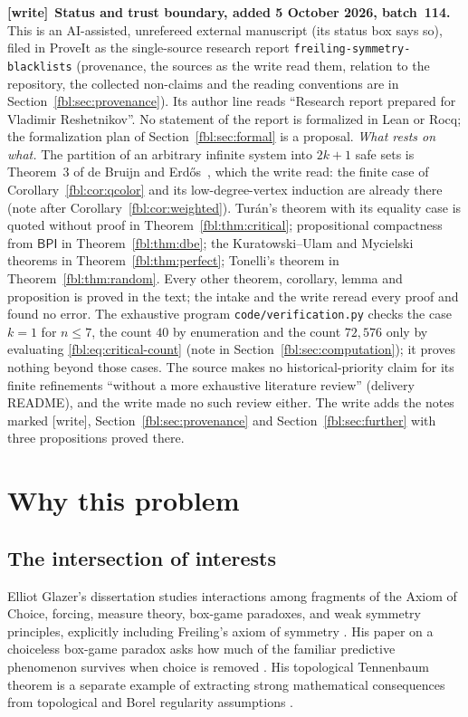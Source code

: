 \documentclass[11pt]{article}
\theoremstyle{definition}
\theoremstyle{remark}
\newcommand{\BPI}{\mathsf{BPI}}
\newcommand{\file}[1]{\nolinkurl{#1}}
\newenvironment{writenote}[1][]{\par\smallskip\begingroup\small
 \noindent\textbf{[write]}\if\relax\detokenize{#1}\relax\else~\textbf{#1.}\fi\ }%
 {\par\endgroup\smallskip}
\begin{document}
\begin{writenote}[Status and trust boundary, added 5 October 2026, batch~114]
This is an AI-assisted, unrefereed external manuscript (its status box says
so), filed in ProveIt as the single-source research report
\file{freiling-symmetry-blacklists} (provenance, the sources as the write
read them, relation to the repository, the collected non-claims and the
reading conventions are in Section~\ref{fbl:sec:provenance}). Its author
line reads ``Research report prepared for Vladimir Reshetnikov''. No
statement of the report is formalized in Lean or Rocq; the formalization
plan of Section~\ref{fbl:sec:formal} is a proposal.
\emph{What rests on what.} The partition of an arbitrary infinite system
into $2k+1$ safe sets is Theorem~3 of de Bruijn and
Erd\H{o}s~\cite{deBruijnErdos}, which the write read: the finite case of
Corollary~\ref{fbl:cor:qcolor} and its low-degree-vertex induction are
already there (note after Corollary~\ref{fbl:cor:weighted}). Tur\'an's
theorem with its equality case is quoted without proof in
Theorem~\ref{fbl:thm:critical}; propositional compactness from $\BPI$ in
Theorem~\ref{fbl:thm:dbe}; the Kuratowski--Ulam and Mycielski theorems in
Theorem~\ref{fbl:thm:perfect}; Tonelli's theorem in
Theorem~\ref{fbl:thm:random}. Every other theorem, corollary, lemma and
proposition is proved in the text; the intake and the write reread every
proof and found no error. The exhaustive program \file{code/verification.py}
checks the case $k=1$ for $n\le7$, the count $40$ by enumeration and the
count $72{,}576$ only by evaluating \eqref{fbl:eq:critical-count} (note in
Section~\ref{fbl:sec:computation}); it proves nothing beyond those cases. The
source makes no historical-priority claim for its finite refinements
``without a more exhaustive literature review'' (delivery README), and the
write made no such review either. The write adds the notes marked [write],
Section~\ref{fbl:sec:provenance} and Section~\ref{fbl:sec:further} with
three propositions proved there.
\end{writenote}

\tableofcontents
\newpage

\section{Why this problem}

\subsection{The intersection of interests}
Elliot Glazer's dissertation studies interactions among fragments of the
Axiom of Choice, forcing, measure theory, box-game paradoxes, and weak
symmetry principles, explicitly including Freiling's axiom of symmetry
\cite{GlazerThesis}.  His paper on a choiceless box-game paradox asks how much
of the familiar predictive phenomenon survives when choice is removed
\cite{GlazerBox}.  His topological Tennenbaum theorem is a separate example
of extracting strong mathematical consequences from topological and Borel
regularity assumptions \cite{GlazerTennenbaum}.
\end{document}
